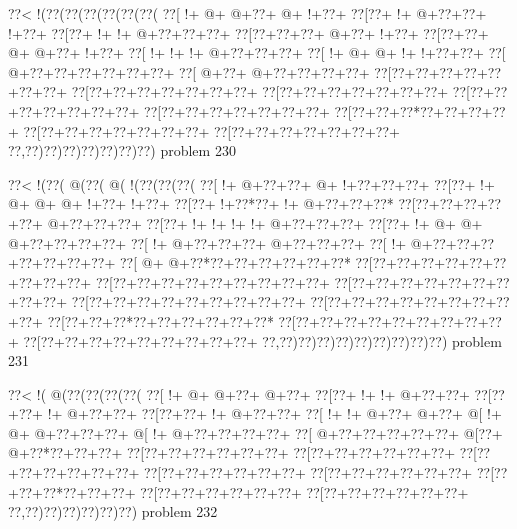 \vbox{\vbox{\goo
\0??<\- !(\0??(\0??(\0??(\0??(\0??(\0??(
\0??[\- !+\- @+\- @+\0??+\- @+\- !+\0??+
\0??[\0??+\- !+\- @+\0??+\0??+\- !+\0??+
\0??[\0??+\- !+\- !+\- @+\0??+\0??+\0??+
\0??[\0??+\0??+\0??+\- @+\0??+\- !+\0??+
\0??[\0??+\0??+\- @+\- @+\0??+\- !+\0??+
\0??[\- !+\- !+\- !+\- @+\0??+\0??+\0??+
\0??[\- !+\- @+\- @+\- !+\- !+\0??+\0??+
\0??[\- @+\0??+\0??+\0??+\0??+\0??+\0??+
\0??[\- @+\0??+\- @+\0??+\0??+\0??+\0??+
\0??[\0??+\0??+\0??+\0??+\0??+\0??+\0??+
\0??[\0??+\0??+\0??+\0??+\0??+\0??+\0??+
\0??[\0??+\0??+\0??+\0??+\0??+\0??+\0??+
\0??[\0??+\0??+\0??+\0??+\0??+\0??+\0??+
\0??[\0??+\0??+\0??+\0??+\0??+\0??+\0??+
\0??[\0??+\0??+\0??*\0??+\0??+\0??+\0??+
\0??[\0??+\0??+\0??+\0??+\0??+\0??+\0??+
\0??[\0??+\0??+\0??+\0??+\0??+\0??+\0??+
\0??,\0??)\0??)\0??)\0??)\0??)\0??)\0??)
}
\hfil problem 230\hfil\break
}

\vbox{\vbox{\goo
\0??<\- !(\0??(\- @(\0??(\- @(\- !(\0??(\0??(\0??(
\0??[\- !+\- @+\0??+\0??+\- @+\- !+\0??+\0??+\0??+
\0??[\0??+\- !+\- @+\- @+\- @+\- !+\0??+\- !+\0??+
\0??[\0??+\- !+\0??*\0??+\- !+\- @+\0??+\0??+\0??*
\0??[\0??+\0??+\0??+\0??+\0??+\- @+\0??+\0??+\0??+
\0??[\0??+\- !+\- !+\- !+\- !+\- @+\0??+\0??+\0??+
\0??[\0??+\- !+\- @+\- @+\- @+\0??+\0??+\0??+\0??+
\0??[\- !+\- @+\0??+\0??+\0??+\- @+\0??+\0??+\0??+
\0??[\- !+\- @+\0??+\0??+\0??+\0??+\0??+\0??+\0??+
\0??[\- @+\- @+\0??*\0??+\0??+\0??+\0??+\0??+\0??*
\0??[\0??+\0??+\0??+\0??+\0??+\0??+\0??+\0??+\0??+
\0??[\0??+\0??+\0??+\0??+\0??+\0??+\0??+\0??+\0??+
\0??[\0??+\0??+\0??+\0??+\0??+\0??+\0??+\0??+\0??+
\0??[\0??+\0??+\0??+\0??+\0??+\0??+\0??+\0??+\0??+
\0??[\0??+\0??+\0??+\0??+\0??+\0??+\0??+\0??+\0??+
\0??[\0??+\0??+\0??*\0??+\0??+\0??+\0??+\0??+\0??*
\0??[\0??+\0??+\0??+\0??+\0??+\0??+\0??+\0??+\0??+
\0??[\0??+\0??+\0??+\0??+\0??+\0??+\0??+\0??+\0??+
\0??,\0??)\0??)\0??)\0??)\0??)\0??)\0??)\0??)\0??)
}
\hfil problem 231\hfil\break
}

\vbox{\vbox{\goo
\0??<\- !(\- @(\0??(\0??(\0??(\0??(
\0??[\- !+\- @+\- @+\0??+\- @+\0??+
\0??[\0??+\- !+\- !+\- @+\0??+\0??+
\0??[\0??+\0??+\- !+\- @+\0??+\0??+
\0??[\0??+\0??+\- !+\- @+\0??+\0??+
\0??[\- !+\- !+\- @+\0??+\- @+\0??+
\- @[\- !+\- @+\- @+\0??+\0??+\0??+
\- @[\- !+\- @+\0??+\0??+\0??+\0??+
\0??[\- @+\0??+\0??+\0??+\0??+\0??+
\- @[\0??+\- @+\0??*\0??+\0??+\0??+
\0??[\0??+\0??+\0??+\0??+\0??+\0??+
\0??[\0??+\0??+\0??+\0??+\0??+\0??+
\0??[\0??+\0??+\0??+\0??+\0??+\0??+
\0??[\0??+\0??+\0??+\0??+\0??+\0??+
\0??[\0??+\0??+\0??+\0??+\0??+\0??+
\0??[\0??+\0??+\0??*\0??+\0??+\0??+
\0??[\0??+\0??+\0??+\0??+\0??+\0??+
\0??[\0??+\0??+\0??+\0??+\0??+\0??+
\0??,\0??)\0??)\0??)\0??)\0??)\0??)
}
\hfil problem 232\hfil\break
}


